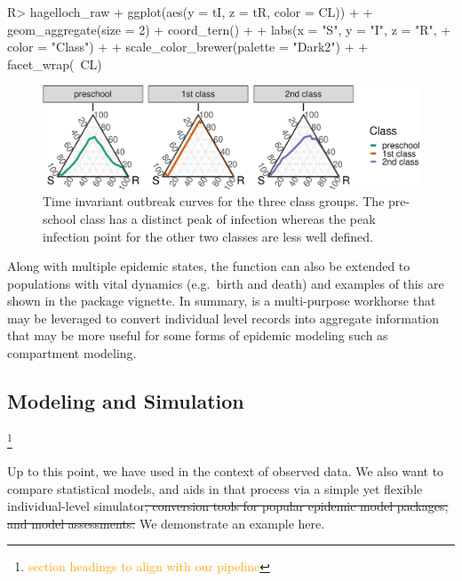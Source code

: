 \documentclass[
  shortnames]{jss}
\begin{document}
\begin{CodeChunk}
\begin{CodeInput}
R> hagelloch_raw %
+   ggplot(aes(y = tI, z = tR, color = CL)) +
+   geom_aggregate(size = 2) + coord_tern() +
+   labs(x = "S", y = "I", z = "R",
+        color = "Class") +
+   scale_color_brewer(palette = "Dark2") +
+   facet_wrap(~CL)
\end{CodeInput}
\begin{figure}[H]

{\centering \includegraphics{Figs/unnamed-chunk-10-1} 

}

\caption{\label{fig:tern-class-data}Time invariant outbreak curves for the three class groups.  The pre-school class has a distinct peak of infection whereas the peak infection point for the other two classes are less well defined.}\label{fig:unnamed-chunk-10}
\end{figure}
\end{CodeChunk}

Along with multiple epidemic states, the function
 can also be extended to populations with
vital dynamics (e.g.~birth and death) and examples of this are shown in
the package vignette. In summary,  is a
multi-purpose workhorse that may be leveraged to convert individual
level records into aggregate information that may be more useful for
some forms of epidemic modeling such as compartment modeling.

\hypertarget{modeling-and-simulation}{%
\subsection{Modeling and Simulation}\label{modeling-and-simulation}}

\footnote{\textcolor{orange}{section headings to align with our pipeline}}

Up to this point, we have used  in the context of
observed data. We also want to compare statistical models, and
 aids in that process via a simple yet flexible
individual-level
simulator\sout{, conversion tools for popular epidemic model packages, and model assessments.}
We demonstrate an example here.
\end{document}
